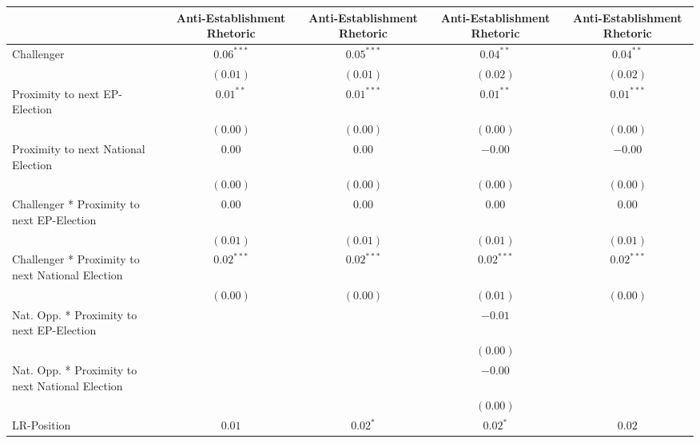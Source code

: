 
\usepackage{booktabs}

\begin{table}
\begin{center}
\begin{tabular}{l c c c c}
\toprule
 & Anti-Establishment Rhetoric & Anti-Establishment Rhetoric & Anti-Establishment Rhetoric & Anti-Establishment Rhetoric \\
\midrule
Challenger                                       & $0.06^{***}$ & $0.05^{***}$ & $0.04^{**}$  & $0.04^{**}$  \\
                                                 & $(0.01)$     & $(0.01)$     & $(0.02)$     & $(0.02)$     \\
Proximity to next EP-Election                    & $0.01^{**}$  & $0.01^{***}$ & $0.01^{**}$  & $0.01^{***}$ \\
                                                 & $(0.00)$     & $(0.00)$     & $(0.00)$     & $(0.00)$     \\
Proximity to next National Election              & $0.00$       & $0.00$       & $-0.00$      & $-0.00$      \\
                                                 & $(0.00)$     & $(0.00)$     & $(0.00)$     & $(0.00)$     \\
Challenger * Proximity to next EP-Election       & $0.00$       & $0.00$       & $0.00$       & $0.00$       \\
                                                 & $(0.01)$     & $(0.01)$     & $(0.01)$     & $(0.01)$     \\
Challenger * Proximity to next National Election & $0.02^{***}$ & $0.02^{***}$ & $0.02^{***}$ & $0.02^{***}$ \\
                                                 & $(0.00)$     & $(0.00)$     & $(0.01)$     & $(0.00)$     \\
Nat. Opp. * Proximity to next EP-Election        &              &              & $-0.01$      &              \\
                                                 &              &              & $(0.00)$     &              \\
Nat. Opp. * Proximity to next National Election  &              &              & $-0.00$      &              \\
                                                 &              &              & $(0.00)$     &              \\
LR-Position                                      & $0.01$       & $0.02^{*}$   & $0.02^{*}$   & $0.02$       \\

\end{tabular}
\end{center}
\end{table}
